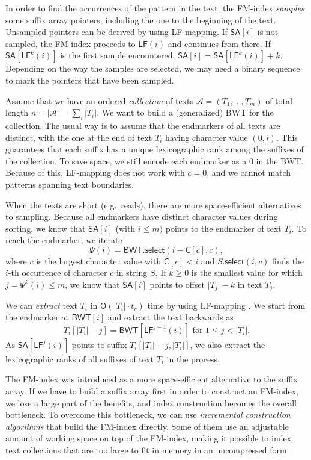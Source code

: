 \documentclass[smallabstract,smallcaptions]{dccpaper}
\newcommand{\abs}[1]{\ensuremath{\lvert #1 \rvert}}
\newcommand{\Oh}{\ensuremath{\mathsf{O}}}
\newcommand{\BWT}{\textsf{BWT}}
\newcommand{\mSA}{\ensuremath{\mathsf{SA}}}
\newcommand{\mBWT}{\ensuremath{\mathsf{BWT}}}
\newcommand{\mC}{\ensuremath{\mathsf{C}}}
\newcommand{\LF}{\textsf{LF}}
\newcommand{\mLF}{\ensuremath{\mathsf{LF}}}
\newcommand{\mselect}{\ensuremath{\mathsf{select}}}
\newcommand{\Acoll}{\ensuremath{\mathcal{A}}}
\begin{document}
In order to find the occurrences of the pattern in the text, the FM-index \emph{samples} some suffix array pointers, including the one to the beginning of the text. Unsampled pointers can be derived by using \LF\nobreakdash-mapping. If $\mSA[i]$ is not sampled, the FM-index proceeds to $\mLF(i)$ and continues from there. If $\mSA[\mLF^{k}(i)]$ is the first sample encountered, $\mSA[i] = \mSA[\mLF^{k}(i)] + k$. Depending on the way the samples are selected, we may need a binary sequence to mark the pointers that have been sampled.

Assume that we have an ordered \emph{collection} of texts $\Acoll = (T_{1}, \dotsc, T_{m})$ of total length $n = \abs{\Acoll} = \sum_{i} \abs{T_{i}}$. We want to build a (generalized) \BWT{} for the collection. The usual way is to assume that the endmarkers of all texts are distinct, with the one at the end of text $T_{i}$ having character value $(0,i)$. This guarantees that each suffix has a unique lexicographic rank among the suffixes of the collection. To save space, we still encode each endmarker as a $0$ in the \BWT{}. Because of this, \LF\nobreakdash-mapping does not work with $c = 0$, and we cannot match patterns spanning text boundaries.

When the texts are short (e.g.~reads), there are more space-efficient alternatives to sampling. Because all endmarkers have distinct character values during sorting, we know that $\mSA[i]$ (with $i \le m)$ points to the endmarker of text $T_{i}$. To reach the endmarker, we iterate
$$
\Psi(i) = \mBWT.\mselect(i - \mC[c], c),
$$
where $c$ is the largest character value with $\mC[c] < i$ and $S.\mselect(i,c)$ finds the $i$\nobreakdash-th occurrence of character $c$ in string $S$. If $k \ge 0$ is the smallest value for which $j = \Psi^{k}(i) \le m$, we know that $\mSA[i]$ points to offset $\abs{T_{j}} - k$ in text $T_{j}$.

We can \emph{extract} text $T_{i}$ in $\Oh(\abs{T_{i}} \cdot t_{r})$ time by using \LF\nobreakdash-mapping \cite{Burrows1994}. We start from the endmarker at $\mBWT[i]$ and extract the text backwards as
$$
T_{i}[\abs{T_{i}} - j] = \mBWT[\LF^{j-1}(i)] \,\, \textrm{for} \,\, 1 \le j < \abs{T_{i}}.
$$
As $\mSA[\LF^{j}(i)]$ points to suffix $T_{i}[\abs{T_{i}}-j, \abs{T_{i}}]$, we also extract the lexicographic ranks of all suffixes of text $T_{i}$ in the process.


\Section{Space-efficient \BWT{} construction}

The FM-index was introduced as a more space-efficient alternative to the suffix array. If we have to build a suffix array first in order to construct an FM-index, we lose a large part of the benefits, and index construction becomes the overall bottleneck. To overcome this bottleneck, we can use \emph{incremental construction algorithms} that build the FM-index directly. Some of them use an adjustable amount of working space on top of the FM-index, making it possible to index text collections that are too large to fit in memory in an uncompressed form.
\end{document}
